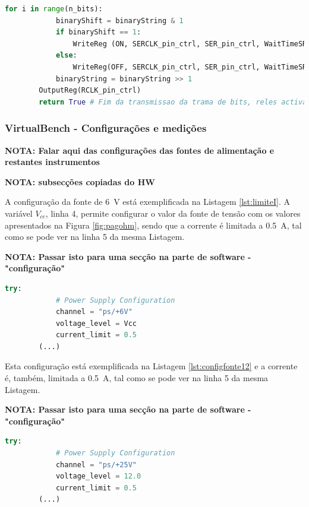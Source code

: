 \begin{minipage}{0.9\linewidth}
	\begin{lstlisting}[language=Python,escapechar=|, caption=\textit{And bit} \textit{bit shift\textunderscore register - NOME DO FICH}, label=lst:andbitabit]
		for i in range(n_bits):
			binaryShift = binaryString & 1
			if binaryShift == 1:
				WriteReg (ON, SERCLK_pin_ctrl, SER_pin_ctrl, WaitTimeSR)
			else:
				WriteReg(OFF, SERCLK_pin_ctrl, SER_pin_ctrl, WaitTimeSR)
			binaryString = binaryString >> 1
		OutputReg(RCLK_pin_ctrl)
		return True # Fim da transmissao da trama de bits, reles activados
	\end{lstlisting}
\end{minipage}

\subsubsection{VirtualBench - Configurações e medições}
\label{sec:configmedicaoes}
\textbf{NOTA: Falar aqui das configurações das fontes de alimentação e restantes instrumentos}

\textbf{NOTA: subsecções copiadas do HW}

A configuração da fonte de \SI{6}{\volt} está exemplificada na Listagem \ref{lst:limiteI}. A variável $V_{cc}$, linha 4,  permite configurar o valor da fonte de tensão com os valores apresentados na Figura \ref{fig:pagohm}, sendo que a corrente é limitada a \SI{0.5}{\ampere}, tal como se pode ver na linha 5 da mesma Listagem.

\textbf{NOTA: Passar isto para uma secção na parte de software - "configuração"}

\begin{minipage}{0.9\linewidth}
	\centering
	\begin{lstlisting}[language=Python, caption=Configuração da fonte de \SI{6}{\volt}, label=lst:limiteI]
		try:
			# Power Supply Configuration
			channel = "ps/+6V"
			voltage_level = Vcc
			current_limit = 0.5
		(...)
	\end{lstlisting}
\end{minipage}

Esta configuração está exemplificada na Listagem \ref{lst:configfonte12} e a corrente é, também, limitada a \SI{0.5}{\ampere}, tal como se pode ver na linha 5 da mesma Listagem.

\textbf{NOTA: Passar isto para uma secção na parte de software - "configuração"}

\begin{minipage}{0.9\linewidth}
	\begin{lstlisting}[language=Python, caption=Configuração da fonte de \SI{12}{\volt}, label=lst:configfonte12]
		try:
			# Power Supply Configuration
			channel = "ps/+25V"
			voltage_level = 12.0
			current_limit = 0.5
		(...)
	\end{lstlisting}
\end{minipage}

